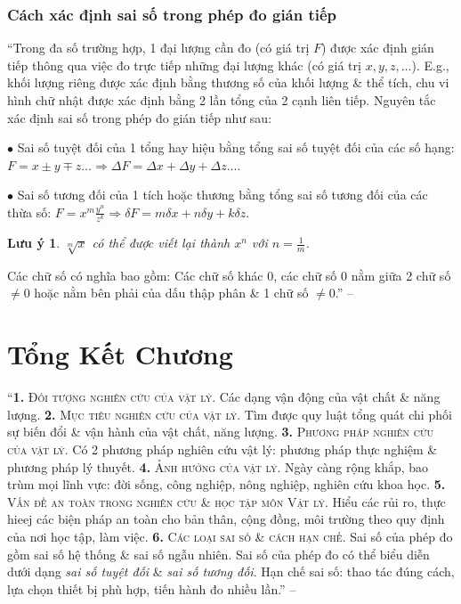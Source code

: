 \documentclass[oneside]{book}
\numberwithin{equation}{section}
\newtheorem{luuy}{Lưu ý}[section]
\begin{document}
\subsubsection{Cách xác định sai số trong phép đo gián tiếp}
``Trong đa số trường hợp, 1 đại lượng cần đo (có giá trị $F$) được xác định gián tiếp thông qua việc đo trực tiếp những đại lượng khác (có giá trị $x,y,z,\ldots$). E.g., khối lượng riêng được xác định bằng thương số của khối lượng \& thể tích, chu vi hình chữ nhật được xác định bằng 2 lần tổng của 2 cạnh liên tiếp. Nguyên tắc xác định sai số trong phép đo gián tiếp như sau:
\begin{enumerate*}
	\item[$\bullet$] Sai số tuyệt đối của 1 tổng hay hiệu bằng tổng sai số tuyệt đối của các số hạng: $F = x\pm y\mp z\ldots\Rightarrow\Delta F = \Delta x + \Delta y + \Delta z\ldots$.
	\item[$\bullet$] Sai số tương đối của 1 tích hoặc thương bằng tổng sai số tương đối của các thừa số: $F = x^m\frac{y^n}{z^k}\Rightarrow\delta F = m\delta x + n\delta y + k\delta z$. 
\end{enumerate*}

\begin{luuy}
	$\sqrt[m]{x}$ có thể được viết lại thành $x^n$ với $n = \frac{1}{m}$. 
\end{luuy}
Các chữ số có nghĩa bao gồm: Các chữ số khác $0$, các chữ số $0$ nằm giữa 2 chữ số $\ne 0$ hoặc nằm bên phải của dấu thập phân \& 1 chữ số $\ne 0$.'' -- \cite[pp. 21--22]{SGK_Vat_Ly_10_Chan_Troi_Sang_Tao}

\section{Tổng Kết Chương}
``\textbf{1.} \textsc{Đối tượng nghiên cứu của vật lý.} Các dạng vận động của vật chất \& năng lượng. \textbf{2.} \textsc{Mục tiêu nghiên cứu của vật lý.} Tìm được quy luật tổng quát chi phối sự biến đổi \& vận hành của vật chất, năng lượng. \textbf{3.} \textsc{Phương pháp nghiên cứu của vật lý.} Có 2 phương pháp nghiên cứu vật lý: phương pháp thực nghiệm \& phương pháp lý thuyết. \textbf{4.} \textsc{Ảnh hưởng của vật lý.} Ngày càng rộng khắp, bao trùm mọi lĩnh vực: đời sống, công nghiệp, nông nghiệp, nghiên cứu khoa học. \textbf{5.} \textsc{Vấn đề an toàn trong nghiên cứu \& học tập môn Vật lý.} Hiểu các rủi ro, thực hieej các biện pháp an toàn cho bản thân, cộng đồng, môi trường theo quy định của nơi học tập, làm việc. \textbf{6.} \textsc{Các loại sai số \& cách hạn chế.} Sai số của phép đo gồm sai số hệ thống \& sai số ngẫu nhiên. Sai số của phép đo có thể biểu diễn dưới dạng \textit{sai số tuyệt đối} \& \textit{sai số tương đối}. Hạn chế sai số: thao tác đúng cách, lựa chọn thiết bị phù hợp, tiến hành đo nhiều lần.'' -- \cite[pp. 23]{SGK_Vat_Ly_10_Chan_Troi_Sang_Tao}
\end{document}
